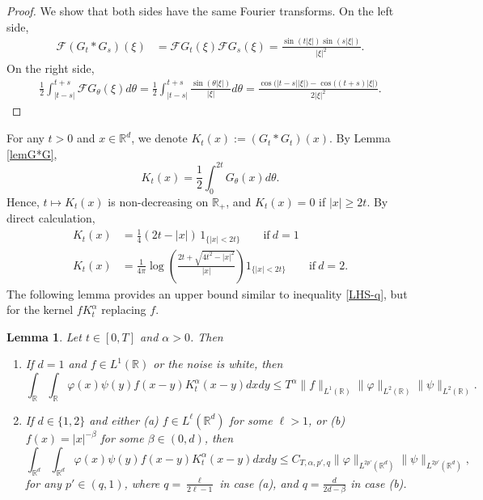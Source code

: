 \documentclass[12pt]{article}
\newtheorem{lemma}[theorem]{Lemma}
\def\cF{\mathcal{F}}
\def\bR{\mathbb{R}}
\begin{document}
\begin{proof}
We show that both sides have the same Fourier transforms. On the left side,
\begin{align*}
\cF(G_t*G_s)(\xi)&= \cF G_t(\xi)\cF G_s(\xi)=\frac{\sin(t|\xi|) \sin(s|\xi|)}{|\xi|^2}.
\end{align*}
On the right side,
\begin{align*}
\frac{1}{2}\int_{|t-s|}^{t+s} \cF G_{\theta}(\xi) d\theta=\frac{1}{2}\int_{|t-s|}^{t+s} \frac{\sin(\theta|\xi|)}{|\xi|} d\theta=\frac{\cos\big(|t-s||\xi|\big)- \cos \big( (t+s)|\xi|\big)}{2|\xi|^2}.
\end{align*}
\end{proof}
For any $t>0$ and $x \in \bR^d$, we denote $K_t(x) := (G_t*G_t)(x)$. By Lemma \ref{lemG*G},
\[
K_t(x) =\frac{1}{2}\int_0^{2t} G_{\theta}(x)d\theta. 
\]
Hence, $t \mapsto K_t(x)$ is non-decreasing on $\bR_{+}$, and $K_t(x)=0$ if $|x| \geq 2t$. By direct calculation,
\begin{align}
\label{def-K1}
 K_t(x) & = \frac{1}{4} (2t - |x|) \, 1_{\{|x| < 2t\}}  \qquad \text{if} \ d = 1 \\
 \label{def-K2}
 K_t(x) & = \frac{1}{4\pi}  \log\left(\frac{2t+\sqrt{4t^2-|x|^2}}{|x|}\right)  1_{\{|x|<2t\}}\qquad \text{if} \ d = 2.
\end{align}
The following lemma provides an upper bound similar to inequality \eqref{LHS-q}, but for the kernel $fK_t^{\alpha}$ replacing $f$.
\begin{lemma} \label{fK int}
Let $ t \in [0, T]$ and $\alpha>0$. Then 
\begin{enumerate}
 \item[(i)] If $d = 1$ and $f \in L^1(\bR)$ or the noise is white, then
\[
\int_{\bR} \int_{\bR} \varphi(x)\psi (y) f(x-y) K_t^{\alpha}(x-y) dx dy  \leq T^{\alpha} \|f\|_{L^1(\bR)} \|\varphi\|_{L^{2}(\bR)}\|\psi\|_{L^{2}(\bR)}.
\]
\item[(ii)] If $d\in \{1,2\}$ and either (a) $f \in L^\ell(\bR^d)$ for some $\ell >1$, or (b) $f(x) = |x|^{-\beta}$ for some $\beta \in (0,d)$, then 
\[
\int_{\bR^d} \int_{\bR^d} \varphi(x)\psi(y) f(x-y)K_t^{\alpha}(x-y)  dx dy \leq C_{T,\alpha,p',q} \|\varphi\|_{L^{2p'}(\bR^d)}\|\psi\|_{L^{2p'}(\bR^d)},
\]
for any $p'\in (q,1)$, where $q=\frac{\ell}{2\ell-1}$ in case (a), and $q=\frac{d}{2d-\beta}$ in case (b). 
\end{enumerate}
\end{lemma}
\end{document}
